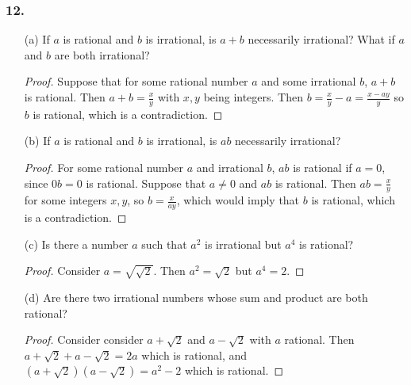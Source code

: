 \documentclass{article}
\begin{document}
\subsubsection*{12.}
\begin{enumerate}
	\item[(a)] If $a$ is rational and $b$ is irrational, is $a + b$ necessarily irrational? What if $a$ and $b$ are both irrational?
	\begin{proof}
		Suppose that for some rational number $a$ and some irrational $b$, $a + b$ is rational. Then $a + b = \frac{x}{y}$ with $x, y$ being integers. Then $b = \frac{x}{y} - a = \frac{x - ay}{y}$ so $b$ is rational, which is a contradiction.
	\end{proof}
	\item[(b)] If $a$ is rational and $b$ is irrational, is $ab$ necessarily irrational?
	\begin{proof}
		For some rational number $a$ and irrational $b$, $ab$ is rational if $a = 0$, since $0b = 0$ is rational. Suppose that $a \ne 0$ and $ab$ is rational. Then $ab = \frac{x}{y}$ for some integers $x, y$, so $b = \frac{x}{ay}$, which would imply that $b$ is rational, which is a contradiction.
	\end{proof}
	\item[(c)] Is there a number $a$ such that $a^2$ is irrational but $a^4$ is rational?
	\begin{proof}
		Consider $a = \sqrt{\sqrt{2}}$. Then $a^2 = \sqrt{2}$ but $a^4 = 2$.
	\end{proof}
	\item[(d)] Are there two irrational numbers whose sum and product are both rational?
	\begin{proof}
		Consider consider $a + \sqrt{2}$ and $a - \sqrt{2}$ with $a$ rational. Then $a + \sqrt{2} + a - \sqrt{2} = 2a$ which is rational, and $(a + \sqrt{2})(a - \sqrt{2}) = a^2 - 2$ which is rational.
	\end{proof}
\end{enumerate}
\end{document}

